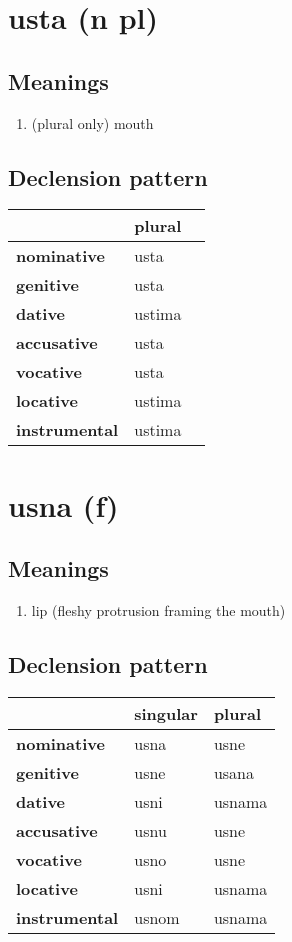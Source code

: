 \filbreak
\section{usta (n pl)}
\subsection*{Meanings}
\begin{enumerate}
\item (plural only) mouth
\end{enumerate}
\subsection*{Declension pattern}
\begin{tabularx}{\linewidth}{Xll}
\toprule
{} &  plural \\
\midrule
\textbf{nominative  } &    usta \\
\textbf{genitive    } &    usta \\
\textbf{dative      } &  ustima \\
\textbf{accusative  } &    usta \\
\textbf{vocative    } &    usta \\
\textbf{locative    } &  ustima \\
\textbf{instrumental} &  ustima \\
\bottomrule
\end{tabularx}

\filbreak
\section{usna (f)}
\subsection*{Meanings}
\begin{enumerate}
\item lip (fleshy protrusion framing the mouth)
\end{enumerate}
\subsection*{Declension pattern}
\begin{tabularx}{\linewidth}{Xll}
\toprule
{} & singular &  plural \\
\midrule
\textbf{nominative  } &     usna &    usne \\
\textbf{genitive    } &     usne &   usana \\
\textbf{dative      } &     usni &  usnama \\
\textbf{accusative  } &     usnu &    usne \\
\textbf{vocative    } &     usno &    usne \\
\textbf{locative    } &     usni &  usnama \\
\textbf{instrumental} &    usnom &  usnama \\
\bottomrule
\end{tabularx}

